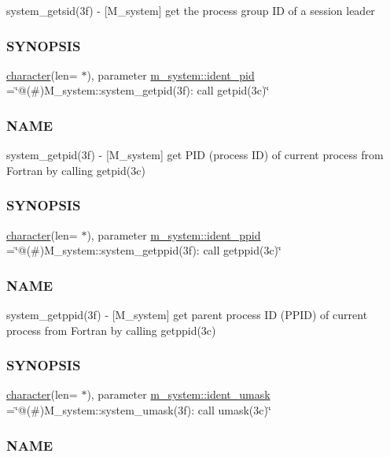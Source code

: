 \begin{DoxyCompactItemize}
\begin{DoxyCompactList}
system\+\_\+getsid(3f) -\/ \mbox{[}M\+\_\+system\mbox{]} get the process group ID of a session leader \subsubsection*{S\+Y\+N\+O\+P\+S\+IS}\end{DoxyCompactList}\item 
\hyperlink{option__stopwatch_83_8txt_abd4b21fbbd175834027b5224bfe97e66}{character}(len= $\ast$), parameter \hyperlink{namespacem__system_a6f5d3dc2ba4ac439e0ba6b428918f956}{m\+\_\+system\+::ident\+\_\+pid} =\char`\"{}@(\#)M\+\_\+system\+::system\+\_\+getpid(3f)\+: call getpid(3c)\char`\"{}
\begin{DoxyCompactList}\small\item\em \subsubsection*{N\+A\+ME}

system\+\_\+getpid(3f) -\/ \mbox{[}M\+\_\+system\mbox{]} get P\+ID (process ID) of current process from Fortran by calling getpid(3c) \subsubsection*{S\+Y\+N\+O\+P\+S\+IS}\end{DoxyCompactList}\item 
\hyperlink{option__stopwatch_83_8txt_abd4b21fbbd175834027b5224bfe97e66}{character}(len= $\ast$), parameter \hyperlink{namespacem__system_afba2912cdf74d31936daa4cd7a195bcb}{m\+\_\+system\+::ident\+\_\+ppid} =\char`\"{}@(\#)M\+\_\+system\+::system\+\_\+getppid(3f)\+: call getppid(3c)\char`\"{}
\begin{DoxyCompactList}\small\item\em \subsubsection*{N\+A\+ME}

system\+\_\+getppid(3f) -\/ \mbox{[}M\+\_\+system\mbox{]} get parent process ID (P\+P\+ID) of current process from Fortran by calling getppid(3c) \subsubsection*{S\+Y\+N\+O\+P\+S\+IS}\end{DoxyCompactList}\item 
\hyperlink{option__stopwatch_83_8txt_abd4b21fbbd175834027b5224bfe97e66}{character}(len= $\ast$), parameter \hyperlink{namespacem__system_a75073212be18a8ed970e7a919cf0c75f}{m\+\_\+system\+::ident\+\_\+umask} =\char`\"{}@(\#)M\+\_\+system\+::system\+\_\+umask(3f)\+: call umask(3c)\char`\"{}
\begin{DoxyCompactList}\small\item\em \subsubsection*{N\+A\+ME}


\end{DoxyCompactList}
\end{DoxyCompactItemize}
